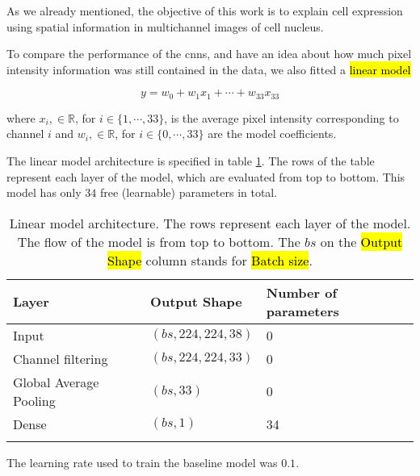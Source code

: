 

\graphicspath{{./Sections/Methodology/Resources/}}


As we already mentioned, the objective of this work is to explain cell expression using spatial information in multichannel images of cell nucleus.

To compare the performance of the \glspl{cnn}, and have an idea about how much pixel intensity information was still contained in the data, we also fitted a  \hl{linear model}

\begin{equation}
  y = w_0 + w_1x_1 + \cdots + w_{33}x_{33}
\end{equation}

\noindent where $x_i, \in \mathbb{R}$, for $i \in \{1, \cdots, 33\}$, is the average pixel intensity corresponding to channel $i$ and $w_i, \in \mathbb{R}$, for $i \in \{0, \cdots, 33\}$ are the model coefficients.

The linear model architecture is specified in table \ref{table:metho:models:lm}. The rows of the table represent each layer of the model, which are evaluated from top to bottom. This model has only $34$ free (learnable) parameters in total.

\setlength{\mylinewidth}{\linewidth-7pt}%
\setlength{\mylengtha}{0.35\mylinewidth-2\arraycolsep}%
\setlength{\mylengthb}{0.25\mylinewidth-2\arraycolsep}%
\setlength{\mylengthc}{0.18\mylinewidth-2\arraycolsep}%

\begin{longtable}{m{\mylengtha} | m{\mylengthb} | m{\mylengthc}}
    \hline
    Layer & Output Shape & Number of parameters \\
    \hline
    Input & $(bs, 224, 224, 38)$ & 0 \\
    \hline
    Channel filtering & $(bs, 224, 224, 33)$ & 0 \\
    \hline
    Global Average Pooling & $(bs, 33)$ & 0 \\
    \hline
    Dense & $(bs, 1)$ & 34 \\
    \hline
  \caption{Linear model architecture. The rows represent each layer of the model. The flow of the model is from top to bottom. The $bs$ on the \hl{Output Shape} column stands for \hl{Batch size}.}
  \label{table:metho:models:lm}
\end{longtable}

The learning rate used to train the baseline model was $0.1$.
